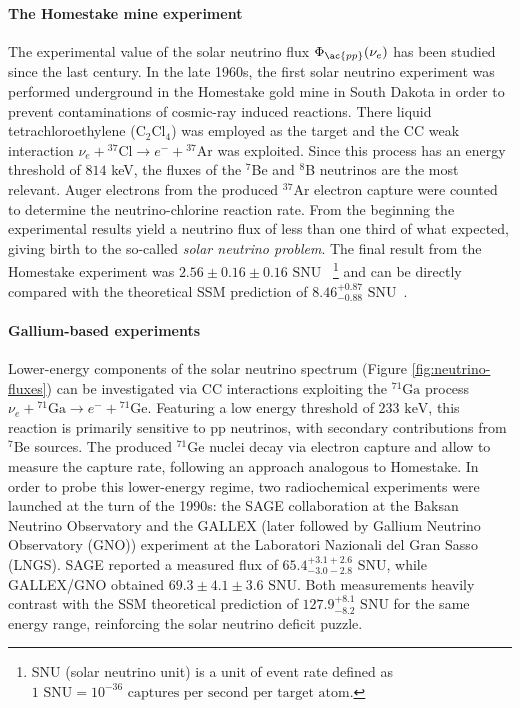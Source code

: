 \paragraph{The Homestake mine experiment}
The experimental value of the solar neutrino flux $\Phi_{\ac{pp}} (\nu_e)$ has been studied since the last century.
In the late 1960s, the first solar neutrino experiment was performed underground in the Homestake gold mine in South Dakota in order to prevent contaminations of cosmic-ray induced reactions. 
There liquid tetrachloroethylene (C$_2$Cl$_4$) was employed as the target and the \ac{CC} weak interaction $\nu_e + {}^{37}\text{Cl} \longrightarrow e^- + {}^{37}\text{Ar}$ was exploited.
Since this process has an energy threshold of $814$ keV, the fluxes of the ${}^{7}$Be and ${}^{8}$B neutrinos are the most relevant.
Auger electrons from the produced ${}^{37}\text{Ar}$ electron capture were counted to determine the neutrino-chlorine reaction rate.
From the beginning the experimental results yield a neutrino flux of less than one third of what expected, giving birth to the so-called \textit{solar neutrino problem}. 
The final result from the Homestake experiment was $2.56 \pm 0.16 \pm 0.16 \text{ SNU}$~
\footnote{SNU (solar neutrino unit) is a unit of event rate defined as $1 \text{ SNU} = 10^{-36}\text{ captures per second per target atom}$.} \cite{HomestakeResults} 
and can be directly compared with the theoretical \ac{SSM} prediction of $8.46^{+0.87}_{-0.88} \text{ SNU}$~\cite{SSMReference}.

\paragraph{Gallium-based experiments}
Lower-energy components of the solar neutrino spectrum (Figure \ref{fig:neutrino-fluxes}) can be investigated via \ac{CC} interactions exploiting the ${}^{71}\text{Ga}$ process $\nu_e + {}^{71}\text{Ga} \longrightarrow e^- + {}^{71}\text{Ge}$.
Featuring a low energy threshold of $233\text{ keV}$, this reaction is primarily sensitive to \ac{pp} neutrinos, with secondary contributions from ${}^{7}\text{Be}$ sources. 
The produced ${}^{71}\text{Ge}$ nuclei decay via electron capture and allow to measure the capture rate, following an approach analogous to Homestake.
In order to probe this lower-energy regime, two radiochemical experiments were launched at the turn of the 1990s: the SAGE collaboration at the Baksan Neutrino Observatory and the GALLEX (later followed by Gallium Neutrino Observatory (GNO)) experiment at the Laboratori Nazionali del Gran Sasso (LNGS). 
SAGE reported a measured flux of $65.4^{+3.1+2.6}_{-3.0-2.8} \text{ SNU}$, while GALLEX/GNO obtained $69.3 \pm 4.1 \pm 3.6 \text{ SNU}$. 
Both measurements heavily contrast with the \ac{SSM} theoretical prediction of $127.9^{+8.1}_{-8.2} \text{ SNU}$ for the same energy range, reinforcing the solar 
neutrino deficit puzzle.

